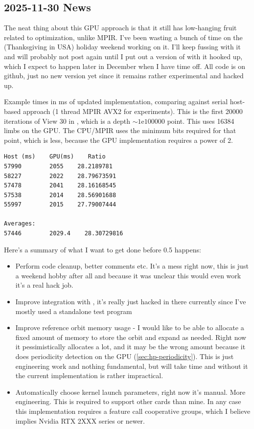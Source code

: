 \subsection{2025-11-30 News}

The neat thing about this GPU approach is that it still has low-hanging fruit 
related to optimization, unlike MPIR.  I've been wasting a bunch of time on the 
(Thanksgiving in USA) holiday weekend working on it.  I'll keep fussing with it 
and will probably not post again until I put out a version of \FractalShark{} with 
it hooked up, which I expect to happen later in December when I have time off.  
All code is on github, just no new version yet since it remains rather 
experimental and hacked up.

Example times in ms of updated implementation, comparing against serial host-
based approach (1 thread MPIR AVX2 for experiments).  This is the first 20000 
iterations of View 30 in \FractalShark{}, which is a depth $\sim 1\mathrm{e}{100000
}$ point.  This uses 16384 limbs on the GPU.  The CPU/MPIR uses the minimum 
bits required for that point, which is less, because the GPU implementation 
requires a power of 2.

\begin{lstlisting}[numbers=none]
Host (ms)    GPU(ms)    Ratio
57990        2055    28.2189781
58227        2022    28.79673591
57478        2041    28.16168545
57538        2014    28.56901688
55997        2015    27.79007444

Averages:
57446        2029.4    28.30729816
\end{lstlisting}

Here's a summary of what I want to get done before \FractalShark{} 0.5 happens:

\begin{itemize}

\item Perform code cleanup, better comments etc.  It's a mess right now, this 
is just a weekend hobby after all and because it was unclear this would even 
work it's a real hack job.

\item Improve integration with \FractalShark{}, it's really just hacked in there 
currently since I've mostly used a standalone test program

\item Improve reference orbit memory usage - I would like to be able to 
allocate a fixed amount of memory to store the orbit and expand as needed.  
Right now it pessimistically allocates a lot, and it may be the wrong amount 
because it does periodicity detection on the GPU (\cref{sec:hp-periodicity}).  This is just engineering 
work and nothing fundamental, but will take time and without it the current 
implementation is rather impractical.

\item Automatically choose kernel launch parameters, right now it's manual.  
More engineering.  This is required to support other cards than mine.  In any 
case this implementation requires a feature call cooperative groups, which I 
believe implies Nvidia RTX 2XXX series or newer.

\end{itemize}

